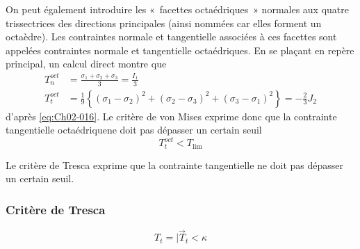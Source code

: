 On peut également introduire les «~facettes octaédriques~» normales aux quatre trissectrices des directions principales (ainsi nommées car elles forment un octaèdre).
Les contraintes normale et tangentielle associées à ces facettes sont appelées contraintes normale et tangentielle octaédriques.
En se plaçant en repère principal, un calcul direct montre que 
\begin{equation}
    \begin{aligned}
        T_n^{oct} &= \frac{\sigma_1+\sigma_2+\sigma_3}{3} = \frac{I_1}{3} \\
        T_t^{oct} &= \frac{1}{9}\left\{ \left(\sigma_1-\sigma_2\right)^2 + \left(\sigma_2-\sigma_3\right)^2 + \left(\sigma_3-\sigma_1\right)^2 \right\} = -\frac{2}{3} J_2
    \end{aligned}
    \label{eq:Ch05-066}
\end{equation}
d'après \eqref{eq:Ch02-016}.
Le critère de von Mises exprime donc que la contrainte tangentielle octaédriquene doit pas dépasser un certain seuil 
\begin{equation}
    T_t^{oct} < T_{\mathrm{lim}}
    \label{eq:Ch05-067}
\end{equation}

Le critère de Tresca exprime que la contrainte tangentielle ne doit pas dépasser un certain seuil.

\subsubsection{Critère de Tresca}
\begin{equation}
    T_t = |\vec{T}_t < \kappa
    \label{eq:Ch05-068}
\end{equation}


